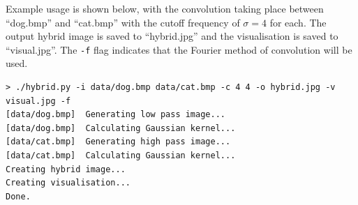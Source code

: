 \documentclass[a4paper]{article}
\begin{document}
Example usage is shown below, with the convolution taking place between ``dog.bmp'' and ``cat.bmp'' with the cutoff frequency of $\sigma=4$ for each. The output hybrid image is saved to ``hybrid.jpg'' and the visualisation is saved to ``visual.jpg''. The \texttt{-f} flag indicates that the Fourier method of convolution will be used.

\begin{verbatim}
> ./hybrid.py -i data/dog.bmp data/cat.bmp -c 4 4 -o hybrid.jpg -v visual.jpg -f
[data/dog.bmp]	Generating low pass image...
[data/dog.bmp]	Calculating Gaussian kernel...
[data/cat.bmp]	Generating high pass image...
[data/cat.bmp]	Calculating Gaussian kernel...
Creating hybrid image...
Creating visualisation...
Done.
\end{verbatim}
\end{document}
